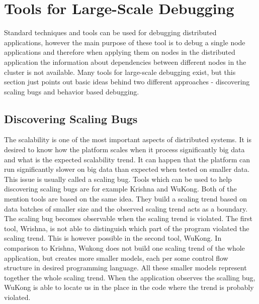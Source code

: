 \section{Tools for Large-Scale Debugging}
Standard techniques and tools can be used for debugging distributed applications, however the main purpose of these tool is to debug a single node applications and therefore when applying them on nodes in the distributed application the information about dependencies between different nodes in the cluster is not available. Many tools for large-scale debugging exist, but this section just points out basic ideas behind two different approaches - discovering scaling bugs and behavior based debugging. 

\subsection{Discovering Scaling Bugs}
The scalability is one of the most important aspects of distributed systems. It is desired to know how the platform scales when it process significantly big data and what is the expected scalability trend. It can happen that the platform can run significantly slower on big data than expected when tested on smaller data. This issue is usually called a scaling bug. Tools which can be used to help discovering scaling bugs are for example Krishna and WuKong. Both of the mention tools are based on the same idea. They build a scaling trend based on data batches of smaller size and the observed scaling trend acts as a boundary. The scaling bug becomes observable when the scaling trend is violated. The first tool, Wrishna, is not able to distinguish which part of the program violated the scaling trend. This is however possible in the second tool, WuKong. In comparison to Krishna, Wukong does not build one scaling trend of the whole application, but creates more smaller models, each per some control flow structure in desired programming language. All these smaller models represent together the whole scaling trend. When the application observes the scalling bug, WuKong is able to locate us in the place in the code where the trend is probably violated.

